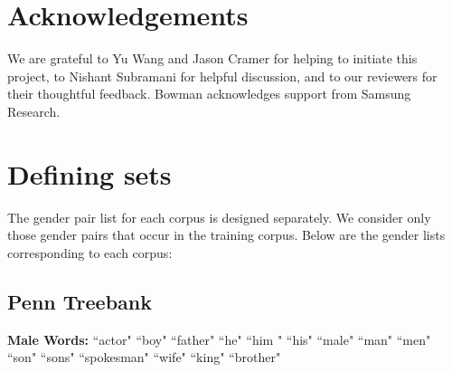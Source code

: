 \documentclass[11pt,a4paper]{article}
\begin{document}

\section{Acknowledgements}
We are grateful to Yu Wang and Jason Cramer for helping to initiate this project, to Nishant Subramani for helpful discussion, and to our reviewers for their thoughtful feedback. Bowman acknowledges support from Samsung Research.







% 
%

\appendix 

\section{Defining sets}
The gender pair list for each corpus is designed separately. We consider only those gender pairs that occur in the training corpus. Below are the gender lists corresponding to each corpus: 
\subsection{Penn Treebank} 
\textbf{Male Words:} 
``actor"
``boy"
``father"
``he"
``him "
``his"
``male"
``man"
``men"
``son"
``sons"
``spokesman"
``wife"
``king"
``brother"
\end{document}

